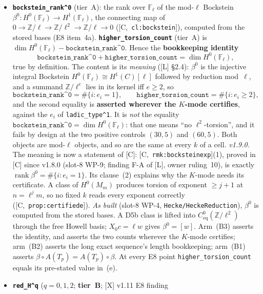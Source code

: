 \documentclass[11pt]{article}
\theoremstyle{remark}
\newcommand{\F}{\mathbb{F}}
\newcommand{\Z}{\mathbb{Z}}
\newcommand{\Fl}{\F_\ell}
\DeclareMathOperator{\rank}{rank}
\newcommand{\HA}[1]{[C,~\texttt{#1}]}      %
\begin{document}
\begin{itemize}
  free, its reduction mod~$\ell$ equals the $\Fl$ characteristic polynomial. Elsewhere it divides
  that polynomial.
\item \textbf{\texttt{bockstein\_rank\textasciicircum0}} (tier~A): the rank over $\Fl$ of the
  mod-$\ell$ Bockstein $\beta^0:H^0(\Fl)\to H^1(\Fl)$, the connecting map of
  $0\to\Z/\ell\to\Z/\ell^2\to\Z/\ell\to0$ (\HA{cl:bockstein}), computed from the stored bases (E8
  item~4a). \textbf{\texttt{higher\_torsion\_count}} (tier~A) is
  $\dim H^0(\Fl)-\texttt{bockstein\_rank\textasciicircum0}$. Hence the \textbf{bookkeeping identity}
  \[
    \texttt{bockstein\_rank\textasciicircum0}+\texttt{higher\_torsion\_count}=\dim H^0(\Fl),
  \]
  true by definition. The content is its \emph{meaning} ([L] \S2.4): $\beta^0$ is the injective
  integral Bockstein $H^0(\Fl)\cong H^1(C)[\ell]$ followed by reduction mod~$\ell$, and a summand
  $\Z/\ell^e$ lies in its kernel iff $e\ge2$, so
  \[
    \texttt{bockstein\_rank\textasciicircum0}=\#\{i:e_i=1\},\qquad
    \texttt{higher\_torsion\_count}=\#\{i:e_i\ge2\},
  \]
  and the second equality is \textbf{asserted wherever the $K$-mode certifies}, against the $e_i$
  of \texttt{ladic\_type\textasciicircum1}. It is \emph{not} the equality
  $\texttt{bockstein\_rank\textasciicircum0}=\dim H^0(\Fl)$: that one means ``no
  $\ell^2$-torsion'', and it fails by design at the two positive controls $(30,5)$ and $(60,5)$.
  Both objects are mod-$\ell$ objects, and so are the same at every $k$ of a cell.
  \emph{v1.9.0.} The meaning is now a statement of [C]: \HA{rmk:bocksteinexp}(1), proved in [C] since
  v1.8.0 (slot-8 WP-9; finding F-A of [L], owner ruling~10), is exactly
  $\rank\beta^0=\#\{i:e_i=1\}$. Its clause~(2) explains why the $K$-mode needs its certificate.
  A class of $H^0(M_m)$ produces torsion of exponent $\ge j+1$ at $n=\ell^jm$, so no fixed $k$
  reads every exponent correctly (\HA{prop:certifiede}). \emph{As built} (slot-8 WP-4,
  \texttt{Hecke/HeckeReduction}), $\beta^0$ is computed from the stored bases. A D5b class is
  lifted into $C^0_{\mathrm{eq}}(\Z/\ell^2)$ through the free Howell basis; $X_0c=\ell w$ gives
  $\beta^0=[w]$. Arm~(B3) asserts the identity, and asserts the two counts wherever the $K$-mode
  certifies; arm~(B2) asserts the long exact sequence's length bookkeeping; arm~(B1) asserts
  $\beta\circ A(T_p)=A(T_p)\circ\beta$. At every E8 point \texttt{higher\_torsion\_count} equals
  its pre-stated value in~(e).
\item \textbf{\texttt{red\_H\textasciicircum q}} ($q=0,1,2$; \textbf{tier~B}; [X] v1.11 E8 finding

\end{itemize}
\end{document}

